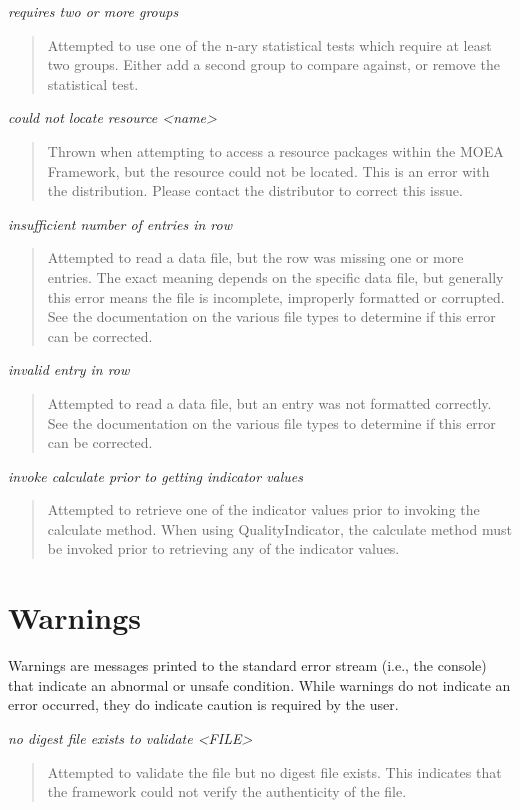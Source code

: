 \noindent
\textit{requires two or more groups}
\begin{quote}
  Attempted to use one of the n-ary statistical tests which require at least two groups.  Either add a second group to compare against, or remove the statistical test.
\end{quote}
  
\noindent
\textit{could not locate resource <name>}
\begin{quote}
  Thrown when attempting to access a resource packages within the MOEA Framework, but the resource could not be located.  This is an error with the distribution.  Please contact the distributor to correct this issue.
\end{quote}
  
\noindent
\textit{insufficient number of entries in row}
\begin{quote}
  Attempted to read a data file, but the row was missing one or more entries. The exact meaning depends on the specific data file, but generally this error means the file is incomplete, improperly formatted or corrupted.  See the documentation on the various file types to determine if this error can be corrected.
\end{quote}
  
\noindent
\textit{invalid entry in row}
\begin{quote}
  Attempted to read a data file, but an entry was not formatted correctly. See the documentation on the various file types to determine if this error can be corrected.
\end{quote}

\noindent
\textit{invoke calculate prior to getting indicator values}
\begin{quote}
  Attempted to retrieve one of the indicator values prior to invoking the calculate method.  When using QualityIndicator, the calculate method must be invoked prior to retrieving any of the indicator values.
\end{quote}


\section{Warnings}
Warnings are messages printed to the standard error stream (i.e., the console) that indicate an abnormal or unsafe condition.  While warnings do not indicate an error occurred, they do indicate caution is required by the user.
\vspace{\baselineskip}

\noindent
\textit{no digest file exists to validate <FILE>}
\begin{quote}
  Attempted to validate the file but no digest file exists.  This indicates that the framework could not verify the authenticity of the file.
\end{quote}
  
